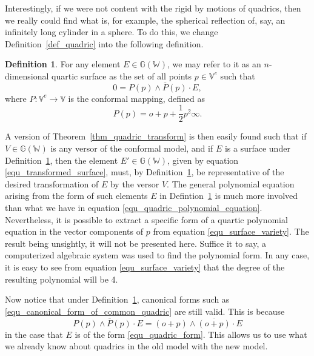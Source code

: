 \documentclass{birkjour}
\theoremstyle{definition}
\newtheorem{defn}[thm]{Definition}
\theoremstyle{remark}
\numberwithin{equation}{section}
\newcommand{\G}{\mathbb{G}}
\newcommand{\V}{\mathbb{V}}
\newcommand{\W}{\mathbb{W}}
\newcommand{\nvao}{o}
\newcommand{\nvai}{\infty}
\begin{document}
Interestingly, if we were not content with the rigid by motions of
quadrics, then we really could find what is, for example, the spherical
reflection of, say, an infinitely long cylinder in a sphere.  To do this, we change
Definition~\ref{def_quadric} into the following definition.
\begin{defn}\label{def_surface}
For any element $E\in\G(\W)$, we may refer to it as an $n$-dimensional
quartic surface as the set of all points $p\in\V^e$ such that
\begin{equation}\label{equ_surface_variety}
0 = P(p)\wedge\overline{P}(p)\cdot E,
\end{equation}
where $P:\V^e\to\V$ is the conformal mapping, defined as
\begin{equation}
P(p) = \nvao + p + \frac{1}{2}p^2\nvai.
\end{equation}
\end{defn}
A version of Theorem~\ref{thm_quadric_transform} is then easily found
such that if $V\in\G(\W)$ is any versor of the conformal model, and if $E$
is a surface under Definition~\ref{def_surface}, then the element $E'\in\G(\W)$,
given by equation \eqref{equ_transformed_surface}, must, by Definition~\ref{def_surface},
 be representative of the desired transformation of $E$ by the versor $V$.  The general
polynomial equation arising from the form of
such elements $E$ in Defintion~\ref{def_surface} is much more involved than
what we have in equation \eqref{equ_quadric_polynomial_equation}.  Nevertheless, it is possible to extract
a specific form of a quartic polynomial equation in
the vector components of $p$ from equation \eqref{equ_surface_variety}.
The result being unsightly, it will not be presented here.  Suffice it to say, a computerized
algebraic system was used to find the polynomial form.  In any case, it is easy
to see from equation \eqref{equ_surface_variety} that the degree of the resulting
polynomial will be 4.

Now notice that under Definition~\ref{def_surface}, canonical forms
such as \eqref{equ_canonical_form_of_common_quadric} are still valid.
This is because
\begin{equation}
P(p)\wedge\overline{P}(p)\cdot E = (\nvao+p)\wedge\overline{(\nvao+p)}\cdot E
\end{equation}
in the case that $E$ is of the form \eqref{equ_quadric_form}.  This allows
us to use what we already know about quadrics in the old model with the new model.
\end{document}
